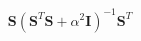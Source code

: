 \documentclass[10pt]{article}
\begin{document}
\[\boldsymbol S 
\left( \boldsymbol S^T \boldsymbol S + \alpha^2 \boldsymbol I \right)^{-1} 
\boldsymbol S^T
\]
\end{document}
